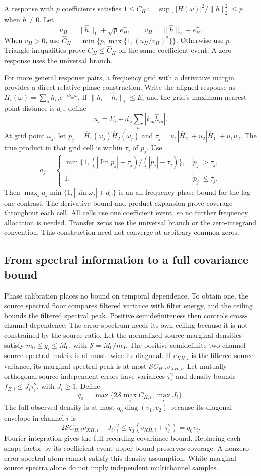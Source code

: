 A response with $p$ coefficients satisfies
$1\le C_H:=\sup_\omega|H(\omega)|^2/\|h\|_2^2\le p$ when $h\ne0$. Let
\[
 u_H=\|\widehat h\|_1+\sqrt p\,e_H^+,\qquad
 v_H=\|\widehat h\|_2-e_H^+.
\]
When $v_H>0$, use $\widehat C_H=\min\{p,\max\{1,(u_H/v_H)^2\}\}$. Otherwise use $p$. Triangle inequalities prove $C_H\le\widehat C_H$ on the same coefficient event. A zero response uses the universal branch.

For more general response pairs, a frequency grid with a derivative margin provides a direct relative-phase construction. Write the aligned response as $H_i(\omega)=\sum_a h_{ia}e^{-ik_{ia}\omega}$. If $\|h_i-\widehat h_i\|_1\le E_i$ and the grid's maximum nearest-point distance is $d_\omega$, define
\[
 u_i=E_i+d_\omega\sum_a|k_{ia}\widehat h_{ia}|.
\]
At grid point $\omega_j$, let $p_j=\widehat H_1(\omega_j)\overline{\widehat H_2(\omega_j)}$ and
$\tau_j=u_1|\widehat H_2|+u_2|\widehat H_1|+u_1u_2$.
The true product in that grid cell is within $\tau_j$ of $p_j$. Use
\[
 a_j=\begin{cases}
 \min\{1,(|\operatorname{Im}p_j|+\tau_j)/(|p_j|-\tau_j)\},&|p_j|>\tau_j,\\
 1,&|p_j|\le\tau_j.
 \end{cases}
\]
Then $\max_j a_j\min\{1,|\sin\omega_j|+d_\omega\}$ is an all-frequency phase bound for the lag-one contrast. The derivative bound and product expansion prove coverage throughout each cell. All cells use one coefficient event, so no further frequency allocation is needed. Transfer zeros use the universal branch or the zero-integrand convention. This construction need not converge at arbitrary common zeros.

\subsection{From spectral information to a full covariance bound}\label{cal16:covariance}
Phase calibration places no bound on temporal dependence. To obtain one, the source spectral floor compares filtered variance with filter energy, and the ceiling bounds the filtered spectral peak. Positive semidefiniteness then controls cross-channel dependence. The error spectrum needs its own ceiling because it is not constrained by the source ratio.
Let the normalized source marginal densities satisfy $m_0\le g_i\le M_0$, with $\mathcal S=M_0/m_0$. The positive-semidefinite two-channel source spectral matrix is at most twice its diagonal. If $v_{XH,i}$ is the filtered source variance, its marginal spectral peak is at most $\mathcal S C_{H,i}v_{XH,i}$. Let mutually orthogonal source-independent errors have variances $\tau_i^2$ and density bounds $f_{E,i}\le J_i\tau_i^2$, with $J_i\ge1$. Define
\[
 q_0=\max\{2\mathcal S\max_i C_{H,i},\max_iJ_i\}.
\]
The full observed density is at most $q_0\operatorname{diag}(v_1,v_2)$ because its diagonal envelope in channel $i$ is
\[
 2\mathcal S C_{H,i}v_{XH,i}+J_i\tau_i^2
 \le q_0(v_{XH,i}+\tau_i^2)=q_0v_i.
\]
Fourier integration gives the full recording covariance bound. Replacing each shape factor by its coefficient-event upper bound preserves coverage. A nonzero error spectral atom cannot satisfy this density assumption. White marginal source spectra alone do not imply independent multichannel samples.
